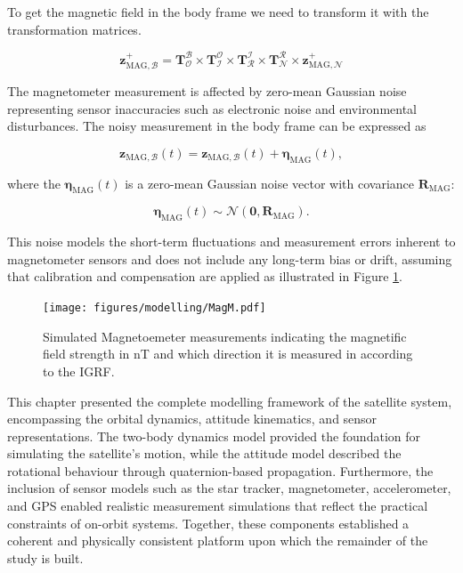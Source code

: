 \noindent To get the magnetic field in the body frame we need to transform it with the transformation matrices.

\begin{equation}
    \mathbf{z}_{\text{MAG},\mathcal{B}}^+ = \mathbf{T}_\mathcal{O}^\mathcal{B} \times \mathbf{T}_\mathcal{I}^\mathcal{O} \times \mathbf{T}_\mathcal{R}^\mathcal{I} \times
    \mathbf{T}_\mathcal{N}^\mathcal{R} \times \mathbf{z}_{\text{MAG},\mathcal{N}}^+ 
\end{equation}


\noindent The magnetometer measurement is affected by zero-mean Gaussian noise representing sensor inaccuracies such as electronic noise and environmental disturbances. 
The noisy measurement in the body frame can be expressed as

\begin{equation}
    \mathbf{z}_{\text{MAG},\mathcal{B}}(t) = \mathbf{z}_{\text{MAG},\mathcal{B}}(t) + \boldsymbol{\eta}_{\text{MAG}}(t),
\end{equation}

\noindent where the \(\boldsymbol{\eta}_{\text{MAG}}(t)\) is a zero-mean Gaussian noise vector with covariance \(\mathbf{R}_{\text{MAG}}\):

\begin{equation}
    \boldsymbol{\eta}_{\text{MAG}}(t) \sim \mathcal{N}(\mathbf{0}, \mathbf{R}_{\text{MAG}}).
\end{equation}

\noindent This noise models the short-term fluctuations and measurement errors inherent to magnetometer sensors and does not include any long-term bias or drift, assuming 
that calibration and compensation are applied as illustrated in Figure \ref{fig:MagM}.

\begin{figure}[H]
    \centering
    \texttt{[image: figures/modelling/MagM.pdf]}
    \caption{Simulated Magnetoemeter measurements indicating the magnetific field strength in nT and which direction it is measured in according to the IGRF.}
    \label{fig:MagM}
\end{figure}

\label{sec:modconclusion}

\noindent
This chapter presented the complete modelling framework of the satellite system, encompassing the orbital dynamics, attitude kinematics, and sensor representations. The two-body dynamics model provided the foundation for simulating the satellite's motion, while the attitude model described the rotational behaviour through quaternion-based propagation. Furthermore, the inclusion of sensor models such as the star tracker, magnetometer, accelerometer, and GPS enabled realistic measurement simulations that reflect the practical constraints of on-orbit systems. Together, these components established a coherent and physically consistent platform upon which the remainder of the study is built.
\vspace{0.5cm}

